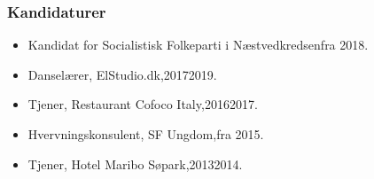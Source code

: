 \documentclass[11pt, a4paper]{awesome-cv}
\begin{document}
\begin{cvletter}
\subsubsection*{Kandidaturer}
\begin{itemize}
\item Kandidat for Socialistisk Folkeparti i Næstvedkredsenfra 2018.
\end{itemize}
\begin{itemize}
\item Danselærer, ElStudio.dk,20172019.
\item Tjener, Restaurant Cofoco Italy,20162017.
\item Hvervningskonsulent, SF Ungdom,fra 2015.
\item Tjener, Hotel Maribo Søpark,20132014.
\end{itemize}
\end{cvletter}
\end{document}

